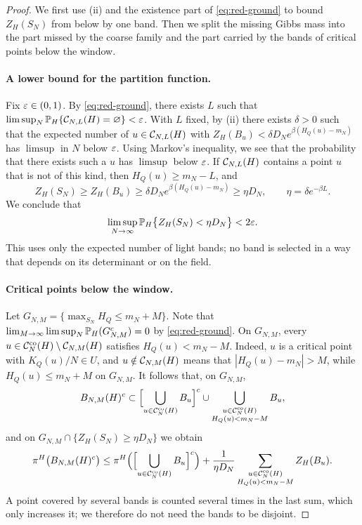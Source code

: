 \begin{proof}
We first use (ii) and the existence part of \eqref{eq:red-ground} to bound $Z_H(S_N)$ from below by one band. Then we split the missing Gibbs mass into the part missed by the coarse family and the part carried by the bands of critical points below the window.

\paragraph{A lower bound for the partition function.}
Fix $\varepsilon\in(0,1)$. By \eqref{eq:red-ground}, there exists $L$ such that $\limsup_N\mathbb P_H\{\mathcal C_{N,L}(H)=\varnothing\}<\varepsilon$. With $L$ fixed, by (ii) there exists $\delta>0$ such that the expected number of $u\in\mathcal C_{N,L}(H)$ with $Z_H(B_u)<\delta D_Ne^{\beta(H_Q(u)-m_N)}$ has $\limsup$ in $N$ below $\varepsilon$. Using Markov's inequality, we see that the probability that there exists such a $u$ has $\limsup$ below $\varepsilon$. If $\mathcal C_{N,L}(H)$ contains a point $u$ that is not of this kind, then $H_Q(u)\ge m_N-L$, and
\begin{equation*}
Z_H(S_N)\ge Z_H(B_u)\ge\delta D_Ne^{\beta(H_Q(u)-m_N)}\ge\eta D_N,\qquad\eta=\delta e^{-\beta L}.
\end{equation*}
We conclude that
\begin{equation}\label{eq:red-denominator}
\limsup_{N\to\infty}\mathbb P_H\bigl\{Z_H(S_N)<\eta D_N\bigr\}<2\varepsilon.
\end{equation}
This uses only the expected number of light bands; no band is selected in a way that depends on its determinant or on the field.

\paragraph{Critical points below the window.}
Let $G_{N,M}=\{\max_{S_N}H_Q\le m_N+M\}$. Note that $\lim_{M\to\infty}\limsup_N\mathbb P_H(G_{N,M}^c)=0$ by \eqref{eq:red-ground}. On $G_{N,M}$, every $u\in\mathcal C^{\mathrm{co}}_N(H)\setminus\mathcal C_{N,M}(H)$ satisfies $H_Q(u)<m_N-M$. Indeed, $u$ is a critical point with $K_Q(u)/N\in U$, and $u\notin\mathcal C_{N,M}(H)$ means that $|H_Q(u)-m_N|>M$, while $H_Q(u)\le m_N+M$ on $G_{N,M}$. It follows that, on $G_{N,M}$,
\begin{equation*}
B_{N,M}(H)^c\subset\Bigl[\bigcup_{u\in\mathcal C^{\mathrm{co}}_N(H)}B_u\Bigr]^c\cup\bigcup_{\substack{u\in\mathcal C^{\mathrm{co}}_N(H)\\H_Q(u)<m_N-M}}B_u,
\end{equation*}
and on $G_{N,M}\cap\{Z_H(S_N)\ge\eta D_N\}$ we obtain
\begin{equation}\label{eq:red-capture-split}
\pi^H\bigl(B_{N,M}(H)^c\bigr)\le\pi^H\Bigl(\Bigl[\bigcup_{u\in\mathcal C^{\mathrm{co}}_N(H)}B_u\Bigr]^c\Bigr)+\frac1{\eta D_N}\sum_{\substack{u\in\mathcal C^{\mathrm{co}}_N(H)\\H_Q(u)<m_N-M}}Z_H(B_u).
\end{equation}
A point covered by several bands is counted several times in the last sum, which only increases it; we therefore do not need the bands to be disjoint.


\end{proof}
